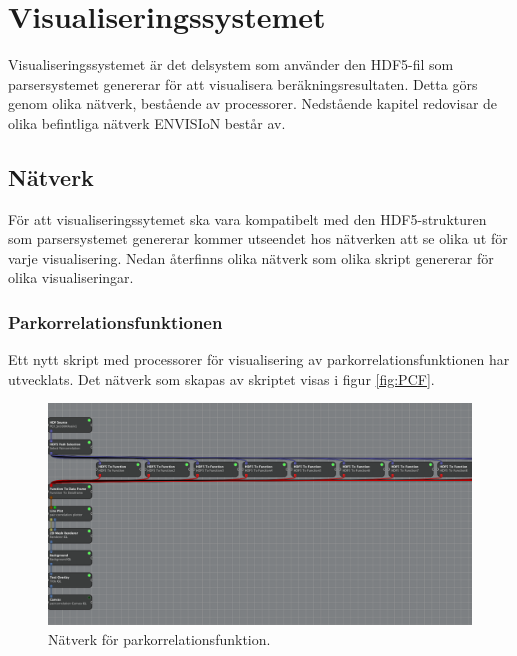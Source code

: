 \documentclass[10pt,oneside,swedish]{article}
\begin{document}
\newpage
\section{Visualiseringssystemet}\label{visualiseringssystemet}

Visualiseringssystemet är det delsystem som använder den HDF5-fil som
parsersystemet genererar för att visualisera beräkningsresultaten. Detta
görs genom olika nätverk, bestående av processorer. Nedstående kapitel
redovisar de olika befintliga nätverk ENVISIoN består av.

\subsection{Nätverk}\label{nuxe4tverk}

För att visualiseringssytemet ska vara kompatibelt med den
HDF5-strukturen som parsersystemet genererar kommer utseendet hos
nätverken att se olika ut för varje visualisering. Nedan återfinns olika
nätverk som olika skript genererar för olika visualiseringar.

\subsubsection{Parkorrelationsfunktionen}\label{parkorrelationsfunktionen}

Ett nytt skript med processorer för visualisering av
parkorrelationsfunktionen har utvecklats. Det nätverk som skapas av
skriptet visas i figur \ref{fig:PCF}.

\begin{figure}[H]
\centering
\includegraphics[width=1.00000\textwidth]{Images/PCF.png}
\caption{Nätverk för parkorrelationsfunktion.}
\label{fig:PCFnetwork}
\end{figure}
\end{document}
